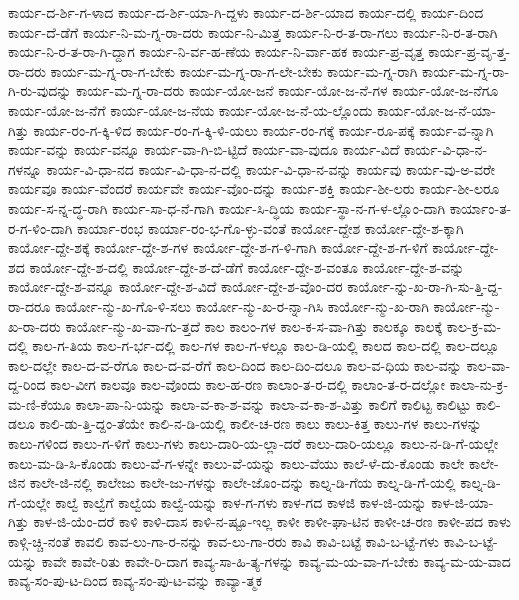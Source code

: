 {ಕಾರ್ಯ-ದ-ರ್ಶಿ-ಗ-ಳಾದ
ಕಾರ್ಯ-ದ-ರ್ಶಿ-ಯಾ-ಗಿ-ದ್ದಳು
ಕಾರ್ಯ-ದ-ರ್ಶಿ-ಯಾದ
ಕಾರ್ಯ-ದಲ್ಲಿ
ಕಾರ್ಯ-ದಿಂದ
ಕಾರ್ಯ-ದೆ-ಡೆಗೆ
ಕಾರ್ಯ-ನಿ-ಮ-ಗ್ನ-ರಾ-ದರು
ಕಾರ್ಯ-ನಿ-ಮಿತ್ತ
ಕಾರ್ಯ-ನಿ-ರ-ತ-ರಾ-ಗಲು
ಕಾರ್ಯ-ನಿ-ರ-ತ-ರಾಗಿ
ಕಾರ್ಯ-ನಿ-ರ-ತ-ರಾ-ಗಿ-ದ್ದಾಗ
ಕಾರ್ಯ-ನಿ-ರ್ವ-ಹ-ಣೆಯ
ಕಾರ್ಯ-ನಿ-ರ್ವಾ-ಹಕ
ಕಾರ್ಯ-ಪ್ರ-ವೃತ್ತ
ಕಾರ್ಯ-ಪ್ರ-ವೃ-ತ್ತ-ರಾ-ದರು
ಕಾರ್ಯ-ಮ-ಗ್ನ-ರಾ-ಗ-ಬೇಕು
ಕಾರ್ಯ-ಮ-ಗ್ನ-ರಾ-ಗ-ಲೇ-ಬೇಕು
ಕಾರ್ಯ-ಮ-ಗ್ನ-ರಾಗಿ
ಕಾರ್ಯ-ಮ-ಗ್ನ-ರಾ-ಗಿ-ರು-ವುದನ್ನು
ಕಾರ್ಯ-ಮ-ಗ್ನ-ರಾ-ದರು
ಕಾರ್ಯ-ಯೋ-ಜನೆ
ಕಾರ್ಯ-ಯೋ-ಜ-ನೆ-ಗಳ
ಕಾರ್ಯ-ಯೋ-ಜ-ನೆಗೂ
ಕಾರ್ಯ-ಯೋ-ಜ-ನೆಗೆ
ಕಾರ್ಯ-ಯೋ-ಜ-ನೆಯ
ಕಾರ್ಯ-ಯೋ-ಜ-ನೆ-ಯ-ಲ್ಲೊಂದು
ಕಾರ್ಯ-ಯೋ-ಜ-ನೆ-ಯಾ-ಗಿತ್ತು
ಕಾರ್ಯ-ರಂ-ಗ-ಕ್ಕಿ-ಳಿದ
ಕಾರ್ಯ-ರಂ-ಗ-ಕ್ಕಿ-ಳಿ-ಯಲು
ಕಾರ್ಯ-ರಂ-ಗಕ್ಕೆ
ಕಾರ್ಯ-ರೂ-ಪಕ್ಕೆ
ಕಾರ್ಯ-ವ-ನ್ನಾಗಿ
ಕಾರ್ಯ-ವನ್ನು
ಕಾರ್ಯ-ವನ್ನೂ
ಕಾರ್ಯ-ವಾ-ಗಿ-ಬಿ-ಟ್ಟಿದೆ
ಕಾರ್ಯ-ವಾ-ವುದೂ
ಕಾರ್ಯ-ವಿದೆ
ಕಾರ್ಯ-ವಿ-ಧಾ-ನ-ಗಳನ್ನೂ
ಕಾರ್ಯ-ವಿ-ಧಾ-ನದ
ಕಾರ್ಯ-ವಿ-ಧಾ-ನ-ದಲ್ಲಿ
ಕಾರ್ಯ-ವಿ-ಧಾ-ನ-ವನ್ನು
ಕಾರ್ಯವು
ಕಾರ್ಯ-ವು-ಅ-ವರೇ
ಕಾರ್ಯವೂ
ಕಾರ್ಯ-ವೆಂದರೆ
ಕಾರ್ಯವೇ
ಕಾರ್ಯ-ವೊಂ-ದನ್ನು
ಕಾರ್ಯ-ಶಕ್ತಿ
ಕಾರ್ಯ-ಶೀ-ಲರು
ಕಾರ್ಯ-ಶೀ-ಲರೂ
ಕಾರ್ಯ-ಸ-ನ್ನ-ದ್ಧ-ರಾಗಿ
ಕಾರ್ಯ-ಸಾ-ಧ-ನೆ-ಗಾಗಿ
ಕಾರ್ಯ-ಸಿ-ದ್ಧಿಯ
ಕಾರ್ಯ-ಸ್ಥಾ-ನ-ಗ-ಳ-ಲ್ಲೊಂ-ದಾಗಿ
ಕಾರ್ಯಾಂ-ತ-ರ-ಗ-ಳಿಂ-ದಾಗಿ
ಕಾರ್ಯಾ-ರಂಭ
ಕಾರ್ಯಾ-ರಂ-ಭ-ಗೊ-ಳ್ಳು-ವಂತೆ
ಕಾರ್ಯೋ-ದ್ದೇಶ
ಕಾರ್ಯೋ-ದ್ದೇ-ಶ-ಕ್ಕಾಗಿ
ಕಾರ್ಯೋ-ದ್ದೇ-ಶಕ್ಕೆ
ಕಾರ್ಯೋ-ದ್ದೇ-ಶ-ಗಳ
ಕಾರ್ಯೋ-ದ್ದೇ-ಶ-ಗ-ಳಿ-ಗಾಗಿ
ಕಾರ್ಯೋ-ದ್ದೇ-ಶ-ಗ-ಳಿಗೆ
ಕಾರ್ಯೋ-ದ್ದೇ-ಶದ
ಕಾರ್ಯೋ-ದ್ದೇ-ಶ-ದಲ್ಲಿ
ಕಾರ್ಯೋ-ದ್ದೇ-ಶ-ದೆ-ಡೆಗೆ
ಕಾರ್ಯೋ-ದ್ದೇ-ಶ-ವಂತೂ
ಕಾರ್ಯೋ-ದ್ದೇ-ಶ-ವನ್ನು
ಕಾರ್ಯೋ-ದ್ದೇ-ಶ-ವನ್ನೂ
ಕಾರ್ಯೋ-ದ್ದೇ-ಶ-ವಿದೆ
ಕಾರ್ಯೋ-ದ್ದೇ-ಶ-ವೊಂ-ದರ
ಕಾರ್ಯೋ-ನ್ನು-ಖ-ರಾ-ಗಿ-ಸು-ತ್ತಿ-ದ್ದ-ರಾ-ದರೂ
ಕಾರ್ಯೋ-ನ್ಮು-ಖ-ಗೊ-ಳಿ-ಸಲು
ಕಾರ್ಯೋ-ನ್ಮು-ಖ-ರ-ನ್ನಾ-ಗಿಸಿ
ಕಾರ್ಯೋ-ನ್ಮು-ಖ-ರಾಗಿ
ಕಾರ್ಯೋ-ನ್ಮು-ಖ-ರಾ-ದರು
ಕಾರ್ಯೋ-ನ್ಮು-ಖ-ವಾ-ಗು-ತ್ತದೆ
ಕಾಲ
ಕಾಲಂ-ಗಳ
ಕಾಲ-ಕ-ಸ-ವಾ-ಗಿತ್ತು
ಕಾಲಕ್ಕೂ
ಕಾಲಕ್ಕೆ
ಕಾಲ-ಕ್ರ-ಮ-ದಲ್ಲಿ
ಕಾಲ-ಗ-ತಿಯ
ಕಾಲ-ಗ-ರ್ಭ-ದಲ್ಲಿ
ಕಾಲ-ಗಳ
ಕಾಲ-ಗ-ಳಲ್ಲೂ
ಕಾಲ-ಡಿ-ಯಲ್ಲಿ
ಕಾಲದ
ಕಾಲ-ದಲ್ಲಿ
ಕಾಲ-ದಲ್ಲೂ
ಕಾಲ-ದಲ್ಲೇ
ಕಾಲ-ದ-ವ-ರೆಗೂ
ಕಾಲ-ದ-ವ-ರೆಗೆ
ಕಾಲ-ದಿಂದ
ಕಾಲ-ದಿಂ-ದಲೂ
ಕಾಲ-ವ-ಧಿಯ
ಕಾಲ-ವನ್ನು
ಕಾಲ-ವಾ-ದ್ದ-ರಿಂದ
ಕಾಲ-ವೀಗ
ಕಾಲವೂ
ಕಾಲ-ವೊಂದು
ಕಾಲ-ಹ-ರಣ
ಕಾಲಾಂ-ತ-ರ-ದಲ್ಲಿ
ಕಾಲಾಂ-ತ-ರ-ದಲ್ಲೋ
ಕಾಲಾ-ನು-ಕ್ರ-ಮ-ಣಿ-ಕೆಯೂ
ಕಾಲಾ-ಪಾ-ನಿ-ಯನ್ನು
ಕಾಲಾ-ವ-ಕಾ-ಶ-ವನ್ನು
ಕಾಲಾ-ವ-ಕಾ-ಶ-ವಿತ್ತು
ಕಾಲಿಗೆ
ಕಾಲಿಟ್ಟ
ಕಾಲಿಟ್ಟು
ಕಾಲಿ-ಡಲೂ
ಕಾಲಿ-ಡು-ತ್ತಿ-ದ್ದಂ-ತೆಯೇ
ಕಾಲಿ-ನ-ಡಿ-ಯಲ್ಲಿ
ಕಾಲೀ-ಚ-ರಣ
ಕಾಲು
ಕಾಲು-ಕಿತ್ತ
ಕಾಲು-ಗಳ
ಕಾಲು-ಗಳನ್ನು
ಕಾಲು-ಗಳಿಂದ
ಕಾಲು-ಗ-ಳಿಗೆ
ಕಾಲು-ಗಳು
ಕಾಲು-ದಾರಿ-ಯ-ಲ್ಲಾ-ದರೆ
ಕಾಲು-ದಾರಿ-ಯಲ್ಲೂ
ಕಾಲು-ನ-ಡಿ-ಗೆ-ಯಲ್ಲೇ
ಕಾಲು-ಮ-ಡಿ-ಸಿ-ಕೊಂಡು
ಕಾಲು-ವೆ-ಗ-ಳನ್ನೇ
ಕಾಲು-ವೆ-ಯನ್ನು
ಕಾಲು-ವೆಯು
ಕಾಲೆ-ಳೆ-ದು-ಕೊಂಡು
ಕಾಲೇ
ಕಾಲೇ-ಜಿನ
ಕಾಲೇ-ಜಿ-ನಲ್ಲಿ
ಕಾಲೇಜು
ಕಾಲೇ-ಜು-ಗಳನ್ನು
ಕಾಲೇ-ಜೊಂ-ದನ್ನು
ಕಾಲ್ನ-ಡಿ-ಗೆಯ
ಕಾಲ್ನ-ಡಿ-ಗೆ-ಯಲ್ಲಿ
ಕಾಲ್ನ-ಡಿ-ಗೆ-ಯಲ್ಲೇ
ಕಾಲ್ವೆ
ಕಾಲ್ವೆಗೆ
ಕಾಲ್ವೆಯ
ಕಾಲ್ವೆ-ಯನ್ನು
ಕಾಳ-ಗ-ಗಳು
ಕಾಳ-ಗದ
ಕಾಳಜಿ
ಕಾಳ-ಜಿ-ಯನ್ನು
ಕಾಳ-ಜಿ-ಯಾ-ಗಿತ್ತು
ಕಾಳ-ಜಿ-ಯೆಂ-ದರೆ
ಕಾಳಿ
ಕಾಳಿ-ದಾಸ
ಕಾಳಿ-ನ-ಷ್ಟೂ-ಇಲ್ಲ
ಕಾಳೀ
ಕಾಳೀ-ಘಾ-ಟಿನ
ಕಾಳೀ-ಚ-ರಣ
ಕಾಳೀ-ಪದ
ಕಾಳು
ಕಾಳ್ಗಿ-ಚ್ಚಿ-ನಂತೆ
ಕಾವಲಿ
ಕಾವ-ಲು-ಗಾ-ರ-ನನ್ನು
ಕಾವ-ಲು-ಗಾ-ರರು
ಕಾವಿ
ಕಾವಿ-ಬಟ್ಟೆ
ಕಾವಿ-ಬ-ಟ್ಟೆ-ಗಳು
ಕಾವಿ-ಬ-ಟ್ಟೆ-ಯನ್ನು
ಕಾವೇ
ಕಾವೇ-ರಿತು
ಕಾವೇ-ರಿ-ದಾಗ
ಕಾವ್ಯ-ಸಾ-ಹಿ-ತ್ಯ-ಗಳನ್ನು
ಕಾವ್ಯ-ಮ-ಯ-ವಾ-ಗ-ಬೇಕು
ಕಾವ್ಯ-ಮ-ಯ-ವಾದ
ಕಾವ್ಯ-ಸಂ-ಪು-ಟ-ದಿಂದ
ಕಾವ್ಯ-ಸಂ-ಪು-ಟ-ವನ್ನು
ಕಾವ್ಯಾ-ತ್ಮಕ
}
